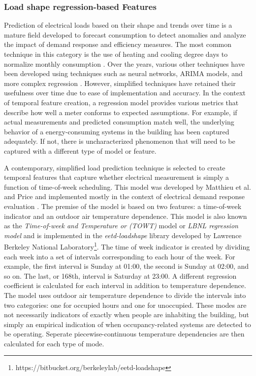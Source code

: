 \subsubsection{Load shape regression-based Features}
\label{sec:regressionmetrics}

Prediction of electrical loads based on their shape and trends over time is a mature field developed to forecast consumption to detect anomalies and analyze the impact of demand response and efficiency measures. The most common technique in this category is the use of heating and cooling degree days to normalize monthly consumption \cite{fels_prism:_1986}. Over the years, various other techniques have been developed using techniques such as neural networks, ARIMA models, and more complex regression \cite{taylor_comparison_2006}. However, simplified techniques have retained their usefulness over time due to ease of implementation and accuracy. In the context of temporal feature creation, a regression model provides various metrics that describe how well a meter conforms to expected assumptions. For example, if actual measurements and predicted consumption match well, the underlying behavior of a energy-consuming systems in the building has been captured adequately. If not, there is uncharacterized phenomenon that will need to be captured with a different type of model or feature. 

A contemporary, simplified load prediction technique is selected to create temporal features that capture whether electrical measurement is simply a function of time-of-week scheduling. This model was developed by Matthieu et al. and Price and implemented mostly in the context of electrical demand response evaluation \cite{price_methods_2010, mathieu_quantifying_2011}. The premise of the model is based on two features: a time-of-week indicator and an outdoor air temperature dependence. This model is also known as the \emph{Time-of-week and Temperature or (TOWT)} model or \emph{LBNL regression model} and is implemented in the \emph{eetd-loadshape} library developed by Lawrence Berkeley National Laboratory\footnote{https://bitbucket.org/berkeleylab/eetd-loadshape}. The time of week indicator is created by dividing each week into a set of intervals corresponding to each hour of the week. For example, the first interval is Sunday at 01:00, the second is Sunday at 02:00, and so on. The last, or 168th, interval is Saturday at 23:00. A different regression coefficient is calculated for each interval in addition to temperature dependence. The model uses outdoor air temperature dependence to divide the intervals into two categories: one for occupied hours and one for unoccupied. These modes are not necessarily indicators of exactly when people are inhabiting the building, but simply an empirical indication of when occupancy-related systems are detected to be operating. Seperate piecewise-continuous temperature dependencies are then calculated for each type of mode. 

